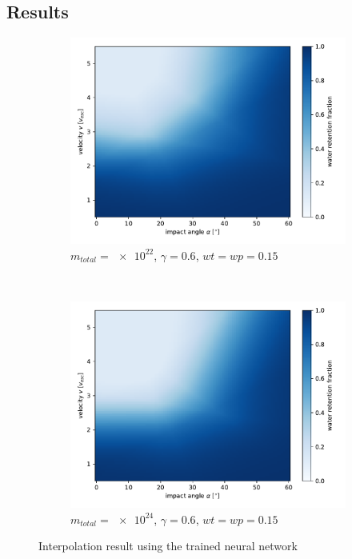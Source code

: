 \subsection{Results}

\begin{figure}[h!] %
	\centering
	\begin{subfigure}[t]{0.5\textwidth}
		\centering
		\includegraphics[width=\linewidth]{images/plots/nn1.pdf}
		\caption{$m_{total}=\num{e22}$, $\gamma=0.6$, $wt=wp=0.15$}
		\label{fig:nn1}
	\end{subfigure}%
	~ 
	\begin{subfigure}[t]{0.5\textwidth}
		\centering
		\includegraphics[width=\linewidth]{images/plots/nn2.pdf}
		\caption{$m_{total}=\num{e24}$, $\gamma=0.6$, $wt=wp=0.15$}
		\label{fig:nn2}
	\end{subfigure}
	\caption{Interpolation result using the trained neural network}
	\label{fig:nnresults}
\end{figure}
